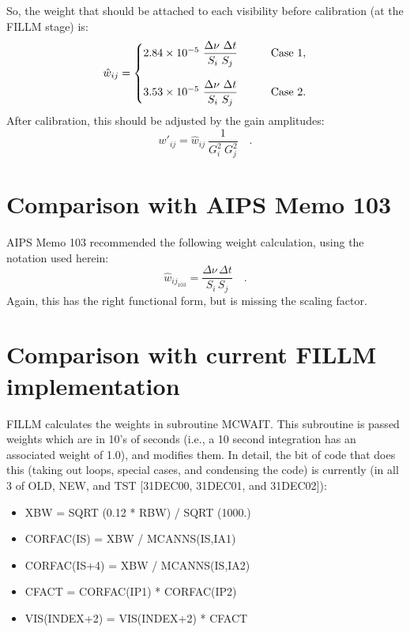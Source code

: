 \documentclass[11pt]{article}
\begin{document}
So, the weight that should be attached to each visibility before
calibration (at the FILLM stage) is:
\begin{equation}
   \hat{w}_{ij} =
      \begin{cases}
         2.84 \times 10^{-5} \
            \dfrac{\Delta\nu \ \Delta{t}}{S_i \ S_j} &
            \qquad {\rm Case \ 1}, \\[6truemm]
         3.53 \times 10^{-5} \
            \dfrac{\Delta\nu \ \Delta{t}}{S_i \ S_j} &
            \qquad {\rm Case \ 2}.
      \end{cases}
\end{equation}
After calibration, this should be adjusted by the gain amplitudes:
\begin{equation}
   w'_{ij} = \hat{w}_{ij} \ \frac{1}{G_i^2 \ G_j^2} \quad .
\end{equation}

\section{Comparison with AIPS Memo 103}

AIPS Memo 103 recommended the following weight calculation, using the
notation used herein:
\begin{equation}
   \hat{w}_{ij_{103}} = \frac{\Delta\nu \, \Delta{t}}{S_i \, S_j}\quad .
\end{equation}
Again, this has the right functional form, but is missing the scaling
factor.

\section{Comparison with current FILLM implementation}

FILLM calculates the weights in subroutine MCWAIT.  This subroutine is
passed weights which are in 10's of seconds (i.e., a 10 second
integration has an associated weight of 1.0), and modifies them.  In
detail, the bit of code that does this (taking out loops, special cases,
and condensing the code) is currently (in all 3 of OLD, NEW, and TST
[31DEC00, 31DEC01, and 31DEC02]):

{
\samepage
\begin{itemize}
   \item[] XBW = SQRT (0.12 * RBW) / SQRT (1000.)
   \vspace*{-2truemm}
   \item[] CORFAC(IS) = XBW / MCANNS(IS,IA1)
   \vspace*{-2truemm}
   \item[] CORFAC(IS+4) = XBW / MCANNS(IS,IA2)
   \vspace*{-2truemm}
   \item[] CFACT = CORFAC(IP1) * CORFAC(IP2)
   \vspace*{-2truemm}
   \item[] VIS(INDEX+2) = VIS(INDEX+2) * CFACT
\end{itemize}
}
\end{document}
